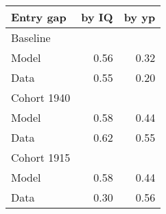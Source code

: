 \begin{tabular}{lrr}
\hline
Entry gap & by IQ  & by yp  \\ 
\hline
Baseline &   &   \\ 
Model & 0.56  & 0.32  \\ 
Data & 0.55  & 0.20  \\ 
Cohort 1940 &   &   \\ 
Model & 0.58  & 0.44  \\ 
Data & 0.62  & 0.55  \\ 
Cohort 1915 &   &   \\ 
Model & 0.58  & 0.44  \\ 
Data & 0.30  & 0.56  \\ 
\hline
\end{tabular}%
